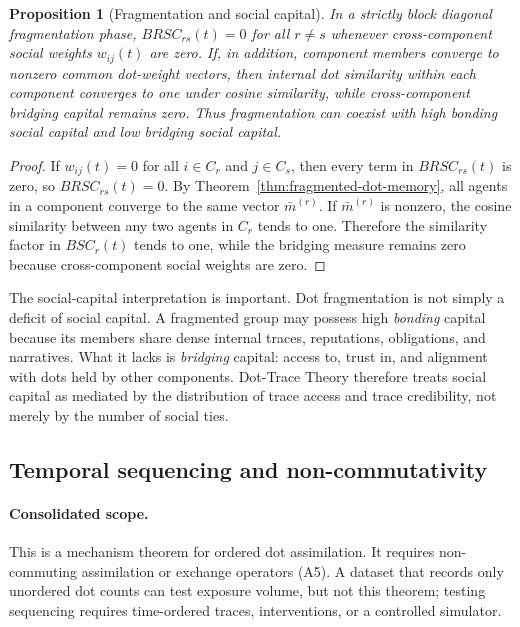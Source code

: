 \documentclass[11pt]{article}
\newtheorem{proposition}{Proposition}
\theoremstyle{remark}
\begin{document}
\begin{proposition}[Fragmentation and social capital]
In a strictly block diagonal fragmentation phase, $BRSC_{rs}(t)=0$ for
all $r\neq s$ whenever cross-component social weights $w_{ij}(t)$ are
zero. If, in addition, component members converge to nonzero common
dot-weight vectors, then internal dot similarity within each component
converges to one under cosine similarity, while cross-component bridging
capital remains zero. Thus fragmentation can coexist with high bonding
social capital and low bridging social capital.
\end{proposition}

\begin{proof}
If $w_{ij}(t)=0$ for all $i\in C_r$ and $j\in C_s$, then every term in
$BRSC_{rs}(t)$ is zero, so $BRSC_{rs}(t)=0$. By
Theorem~\ref{thm:fragmented-dot-memory}, all agents in a component
converge to the same vector $\bar m^{(r)}$. If $\bar m^{(r)}$ is nonzero,
the cosine similarity between any two agents in $C_r$ tends to one.
Therefore the similarity factor in $BSC_r(t)$ tends to one, while the
bridging measure remains zero because cross-component social weights are
zero.
\end{proof}

The social-capital interpretation is important. Dot fragmentation is not
simply a deficit of social capital. A fragmented group may possess high
\emph{bonding} capital because its members share dense internal traces,
reputations, obligations, and narratives. What it lacks is
\emph{bridging} capital: access to, trust in, and alignment with dots
held by other components. Dot-Trace Theory therefore treats social
capital as mediated by the distribution of trace access and trace
credibility, not merely by the number of social ties.

\subsection{Temporal sequencing and non-commutativity}\label{temporal-sequencing-and-non-commutativity}

\paragraph{Consolidated scope.} This is a mechanism theorem for ordered dot assimilation. It requires non-commuting assimilation or exchange operators (A5). A dataset that records only unordered dot counts can test exposure volume, but not this theorem; testing sequencing requires time-ordered traces, interventions, or a controlled simulator.
\end{document}
